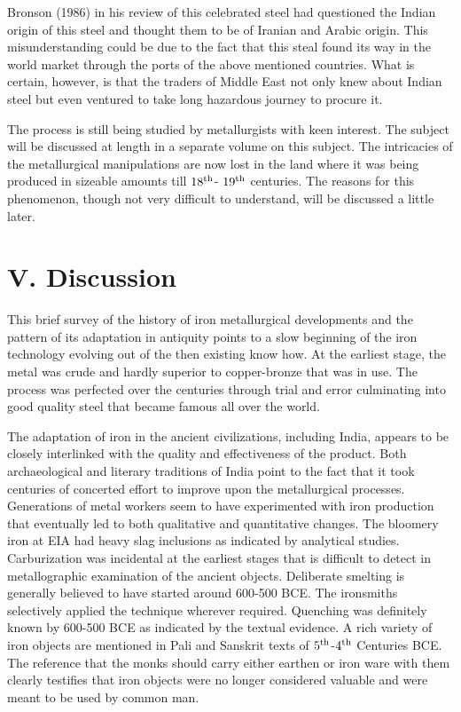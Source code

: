 Bronson (1986) in his review of this celebrated steel had questioned the Indian origin of this steel and thought them to be of Iranian and Arabic origin. This misunderstanding could be due to the fact that this steal found its way in the world market through the ports of the above mentioned countries. What is certain, however, is that the traders of Middle East not only knew about Indian steel but even ventured to take long hazardous journey to procure it.

The process is still being studied by metallurgists with keen interest. The subject will be discussed at length in a separate volume on this subject. The intricacies of the metallurgical manipulations are now lost in the land where it was being produced in sizeable amounts till $18^{\rm th}$- $19^{\rm th}$ centuries. The reasons for this phenomenon, though not very difficult to understand, will be discussed a little later. 

\section*{V. Discussion }\label{section-5}

This brief survey of the history of iron metallurgical developments and the pattern of its adaptation in antiquity points to a slow beginning of the iron technology evolving out of the then existing know how. At the earliest stage, the metal was crude and hardly superior to copper-bronze that was in use. The process was perfected over the centuries through trial and error culminating into good quality steel that became famous all over the world. 

The adaptation of iron in the ancient civilizations, including India, appears to be closely interlinked with the quality and effectiveness of the product. Both archaeological and literary traditions of India point to the fact that it took centuries of concerted effort to improve upon the metallurgical processes. Generations of metal workers seem to have experimented with iron production that eventually led to both qualitative and quantitative changes. The bloomery iron at EIA had heavy slag inclusions as indicated by analytical studies. Carburization was incidental at the earliest stages that is difficult to detect in metallographic examination of the ancient objects. Deliberate smelting is generally believed to have started around 600-500 BCE.  The ironsmiths selectively applied the technique wherever required. Quenching was definitely known by 600-500 BCE as indicated by the textual evidence. A rich variety of iron objects are mentioned   in Pali and Sanskrit texts of $5^{\rm th}$-$4^{\rm th}$ Centuries BCE. The reference that the monks should carry either earthen or iron ware with them clearly testifies that iron objects were no longer considered valuable and were meant to be used by common man.

